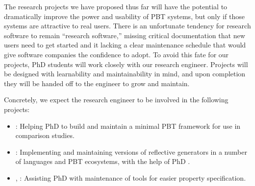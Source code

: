 


The research projects we have proposed thus far will have the potential to
dramatically improve the power and usability of PBT systems, but only if those
systems are attractive to real users. There is an unfortunate tendency for
research software to remain ``research software,'' missing critical
documentation that new users need to get started and it lacking a clear
maintenance schedule that would give software companies the confidence to adopt.
To avoid this fate for our projects, PhD students will work closely with our
research engineer. Projects will be designed with learnability and
maintainability in mind, and upon completion they will be handed off to the
engineer to grow and maintain.

Concretely, we expect the research engineer to be involved in the following
projects:
\begin{itemize}[noitemsep]
  \item {}: Helping PhD  to build and maintain a minimal PBT
  framework for use in comparison studies.
  \item {}: Implementing and maintaining versions of
  reflective generators in a number of languages and PBT ecosystems, with the
  help of PhD .
  \item {}, : Assisting PhD
   with maintenance of tools for easier property specification.
\end{itemize}


